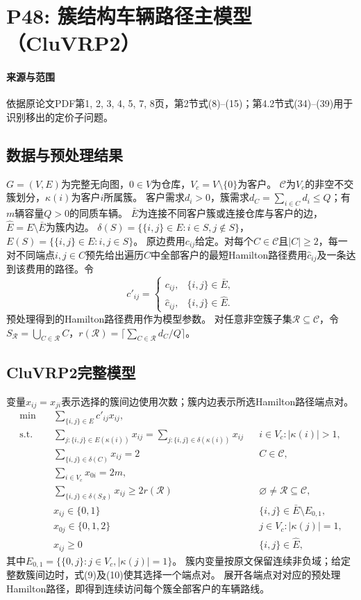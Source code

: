 \documentclass[UTF8,11pt]{ctexart}
\begin{document}
\section*{P48: 簇结构车辆路径主模型（CluVRP2）}
\paragraph{来源与范围}依据原论文PDF第1, 2, 3, 4, 5, 7, 8页，第2节式(8)–(15)；第4.2节式(34)–(39)用于识别移出的定价子问题。

\subsection*{数据与预处理结果}
$G=(V,E)$为完整无向图，$0\in V$为仓库，$V_c=V\setminus\{0\}$为客户。
$\mathcal C$为$V_c$的非空不交簇划分，$\kappa(i)$为客户$i$所属簇。
客户需求$d_i>0$，簇需求$d_C=\sum_{i\in C}d_i\le Q$；有$m$辆容量$Q>0$的同质车辆。
$\bar E$为连接不同客户簇或连接仓库与客户的边，$\hat E=E\setminus\bar E$为簇内边。
$\delta(S)=\{\{i,j\}\in E:i\in S,j\notin S\}$，$E(S)=\{\{i,j\}\in E:i,j\in S\}$。
原边费用$c_{ij}$给定。对每个$C\in\mathcal C$且$|C|\ge2$，每一对不同端点$i,j\in C$预先给出遍历$C$中全部客户的最短Hamilton路径费用$\hat c_{ij}$及一条达到该费用的路径。令
\[
 c'_{ij}=\begin{cases}c_{ij},&\{i,j\}\in\bar E,\\\hat c_{ij},&\{i,j\}\in\hat E.\end{cases}
\]
预处理得到的Hamilton路径费用作为模型参数。
对任意非空簇子集$\mathcal R\subseteq\mathcal C$，令$S_{\mathcal R}=\bigcup_{C\in\mathcal R}C$，$r(\mathcal R)=\lceil\sum_{C\in\mathcal R}d_C/Q\rceil$。
\subsection*{CluVRP2完整模型}
变量$x_{ij}=x_{ji}$表示选择的簇间边使用次数；簇内边表示所选Hamilton路径端点对。
\begin{align}
\min\quad &\sum_{\{i,j\}\in E}c'_{ij}x_{ij},\tag{8}\\
\text{s.t.}\quad&\sum_{j:\{i,j\}\in E(\kappa(i))}x_{ij}=\sum_{j:\{i,j\}\in\delta(\kappa(i))}x_{ij} &&i\in V_c:|\kappa(i)|>1,\tag{9}\\
&\sum_{\{i,j\}\in\delta(C)}x_{ij}=2 &&C\in\mathcal C,\tag{10}\\
&\sum_{i\in V_c}x_{0i}=2m,\tag{11}\\
&\sum_{\{i,j\}\in\delta(S_{\mathcal R})}x_{ij}\ge2r(\mathcal R) &&\varnothing\ne\mathcal R\subseteq\mathcal C,\tag{12}\\
&x_{ij}\in\{0,1\} &&\{i,j\}\in\bar E\setminus E_{0,1},\tag{13}\\
&x_{0j}\in\{0,1,2\} &&j\in V_c:|\kappa(j)|=1,\tag{14}\\
&x_{ij}\ge0 &&\{i,j\}\in\hat E,\tag{15}
\end{align}
其中$E_{0,1}=\{\{0,j\}:j\in V_c,|\kappa(j)|=1\}$。
簇内变量按原文保留连续非负域；给定整数簇间边时，式(9)及(10)使其选择一个端点对。
展开各端点对对应的预处理Hamilton路径，即得到连续访问每个簇全部客户的车辆路线。
\end{document}
